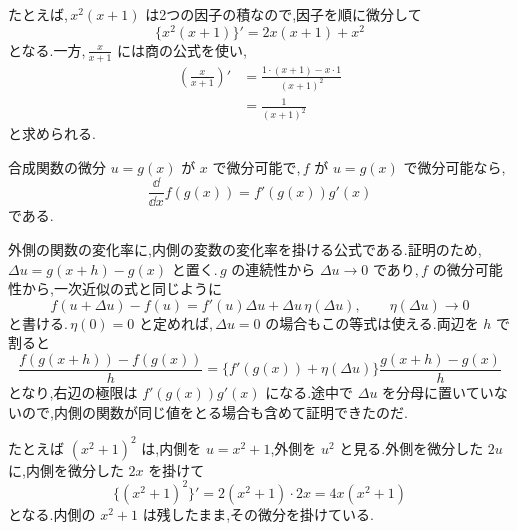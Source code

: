 たとえば,\,$x^2(x+1)$ は2つの因子の積なので,因子を順に微分して
\[
 \{x^2(x+1)\}'=2x(x+1)+x^2
\]
となる.一方,\,$\frac{x}{x+1}$ には商の公式を使い,
\begin{align*}
 \left(\frac{x}{x+1}\right)'
 &=\frac{1\cdot(x+1)-x\cdot1}{(x+1)^2}\\
 &=\frac1{(x+1)^2}
\end{align*}
と求められる.

\begin{theorem}{合成関数の微分}\label{定理:合成微分}
$u=g(x)$ が $x$ で微分可能で,\,$f$ が $u=g(x)$ で微分可能なら,
\[
 \frac{\dd}{\dd x}f(g(x))=f'(g(x))g'(x)
\]
である.
\end{theorem}

外側の関数の変化率に,内側の変数の変化率を掛ける公式である.証明のため,\,$\Delta u=g(x+h)-g(x)$ と置く.\,$g$ の連続性から $\Delta u\to0$ であり,\,$f$ の微分可能性から,一次近似の式と同じように
\[
 f(u+\Delta u)-f(u)=f'(u)\Delta u+\Delta u\,\eta(\Delta u),
 \qquad \eta(\Delta u)\to0
\]
と書ける.\,$\eta(0)=0$ と定めれば,\,$\Delta u=0$ の場合もこの等式は使える.両辺を $h$ で割ると
\[
 \frac{f(g(x+h))-f(g(x))}h
 =\{f'(g(x))+\eta(\Delta u)\}
   \frac{g(x+h)-g(x)}h
\]
となり,右辺の極限は $f'(g(x))g'(x)$ になる.途中で $\Delta u$ を分母に置いていないので,内側の関数が同じ値をとる場合も含めて証明できたのだ.

たとえば $(x^2+1)^2$ は,内側を $u=x^2+1$,外側を $u^2$ と見る.外側を微分した $2u$ に,内側を微分した $2x$ を掛けて
\[
 \{(x^2+1)^2\}'=2(x^2+1)\cdot2x=4x(x^2+1)
\]
となる.内側の $x^2+1$ は残したまま,その微分を掛けている.
